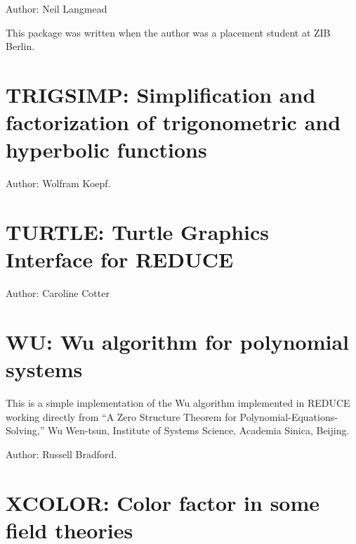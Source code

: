 Author: Neil Langmead

This package was written when the author was a placement student at ZIB Berlin.




\section{TRIGSIMP: Simplification and factorization of trigonometric
and hyperbolic functions} 

\label{TRIGSIMP}

\iffalse
TRIGSIMP is a useful tool for all kinds of trigonometric and hyperbolic
simplification and factorization.  There are three procedures included in
TRIGSIMP: trigsimp, trigfactorize and triggcd.  The first is for finding
simplifications of trigonometric or hyperbolic expressions with many
options, the second for factorizing them and the third for finding the
greatest common divisor of two trigonometric or hyperbolic polynomials.
\fi
Author: Wolfram Koepf.



\newpage

\section{TURTLE: Turtle Graphics Interface for REDUCE}

Author: Caroline Cotter




\newpage

\section{WU: Wu algorithm for polynomial systems} 

This is a simple implementation of the Wu algorithm implemented in REDUCE
working directly from ``A Zero Structure Theorem for
Polynomial-Equations-Solving,'' Wu Wen-tsun, Institute of Systems Science,
Academia Sinica, Beijing.

Author: Russell Bradford.



\newpage

\section{XCOLOR: Color factor in some field theories}

